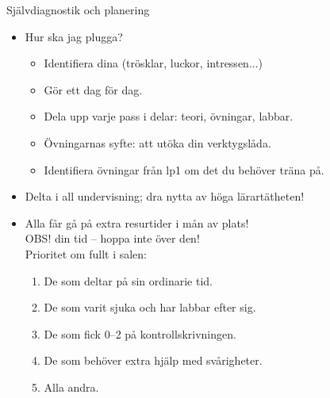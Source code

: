 \begin{Slide}{Självdiagnostik och planering}
\begin{itemize}
  \item Hur ska jag plugga?
  \begin{itemize}
    \item Identifiera dina  (trösklar, luckor, intressen...)
    \item Gör ett  dag för dag.
    \item Dela upp varje pass i delar: teori, övningar, labbar. 
    \item Övningarnas syfte: att utöka din verktygslåda.
    \item Identifiera övningar från lp1 om det du behöver träna på.
  \end{itemize}
  \item Delta i all undervisning; dra nytta av höga lärartätheten!
  \item Alla får gå på extra resurtider i mån av plats!\\OBS!  din  tid -- hoppa inte över den!\\Prioritet om fullt i salen:
  \begin{enumerate}
    \item De som deltar på sin ordinarie tid.
    \item De som varit sjuka och har labbar efter sig.
    \item De som fick 0--2 på kontrollskrivningen.
    \item De som behöver extra hjälp med svårigheter.
    \item Alla andra.
  \end{enumerate}
\end{itemize}
\end{Slide}

{
}

